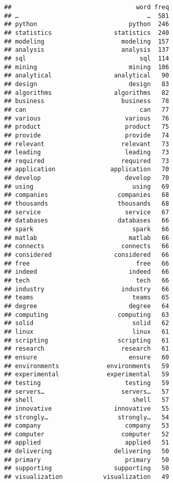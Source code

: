 \documentclass[]{article}
\begin{document}
\begin{verbatim}
##                                  word freq
## …                                   …  581
## python                         python  246
## statistics                 statistics  240
## modeling                     modeling  157
## analysis                     analysis  137
## sql                               sql  114
## mining                         mining  106
## analytical                 analytical   90
## design                         design   83
## algorithms                 algorithms   82
## business                     business   78
## can                               can   77
## various                       various   76
## product                       product   75
## provide                       provide   74
## relevant                     relevant   73
## leading                       leading   73
## required                     required   73
## application               application   70
## develop                       develop   70
## using                           using   69
## companies                   companies   68
## thousands                   thousands   68
## service                       service   67
## databases                   databases   66
## spark                           spark   66
## matlab                         matlab   66
## connects                     connects   66
## considered                 considered   66
## free                             free   66
## indeed                         indeed   66
## tech                             tech   66
## industry                     industry   66
## teams                           teams   65
## degree                         degree   64
## computing                   computing   63
## solid                           solid   62
## linux                           linux   61
## scripting                   scripting   61
## research                     research   61
## ensure                         ensure   60
## environments             environments   59
## experimental             experimental   59
## testing                       testing   59
## servers…                     servers…   57
## shell                           shell   57
## innovative                 innovative   55
## strongly…                   strongly…   54
## company                       company   53
## computer                     computer   52
## applied                       applied   51
## delivering                 delivering   50
## primary                       primary   50
## supporting                 supporting   50
## visualization           visualization   49

\end{verbatim}
\end{document}
